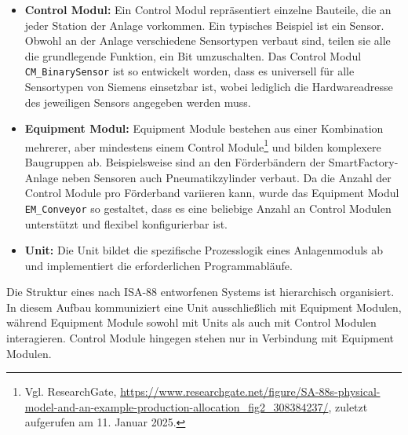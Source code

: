 \sloppy
\begin{itemize}
    \item \textbf{Control Modul:} Ein Control Modul repräsentiert einzelne Bauteile, die an jeder Station der Anlage
    vorkommen. Ein typisches Beispiel ist ein Sensor. Obwohl an der Anlage verschiedene Sensortypen verbaut sind, teilen 
    sie alle die grundlegende Funktion, ein Bit umzuschalten. Das Control Modul \texttt{CM\_BinarySensor} ist so entwickelt 
    worden, dass es universell für alle Sensortypen von Siemens einsetzbar ist, wobei lediglich die Hardwareadresse des jeweiligen 
    Sensors angegeben werden muss.

    \item \textbf{Equipment Modul:} Equipment Module bestehen aus einer Kombination mehrerer, aber mindestens einem Control Module\footnote{Vgl. ResearchGate, \url{https://www.researchgate.net/figure/SA-88s-physical-model-and-an-example-production-allocation_fig2_308384237/}, zuletzt aufgerufen am 11. Januar 2025.}
    und bilden komplexere Baugruppen ab. Beispielsweise sind an den Förderbändern der SmartFactory-Anlage neben Sensoren auch 
    Pneumatikzylinder verbaut. Da die Anzahl der Control Module pro Förderband variieren kann, wurde das Equipment Modul 
    \texttt{EM\_Conveyor} so gestaltet, dass es eine beliebige Anzahl an Control Modulen unterstützt und flexibel 
    konfigurierbar ist.

    \item \textbf{Unit:} Die Unit bildet die spezifische Prozesslogik eines Anlagenmoduls ab und implementiert die 
    erforderlichen Programmabläufe.
\end{itemize}

Die Struktur eines nach ISA-88 entworfenen Systems ist hierarchisch organisiert. In diesem Aufbau kommuniziert eine Unit 
ausschließlich mit Equipment Modulen, während Equipment Module sowohl mit Units als auch mit Control Modulen interagieren. 
Control Module hingegen stehen nur in Verbindung mit Equipment Modulen.